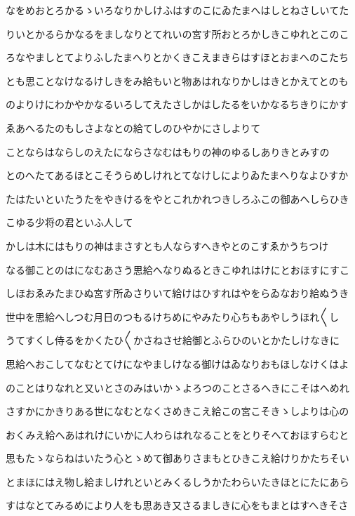 \documentclass[a4paper,11pt,landscape]{ltjtarticle}
\begin{document}
なをめおとろかるゝいろなりかしけふはすのこにゐたまへはしとねさしいてた
\par\medskip
りいとかるらかなるをましなりとてれいの宮す所おとろかしきこゆれとこのこ
\par\medskip
ろなやましとてよりふしたまへりとかくきこえまきらはすほとおまへのこたち
\par\medskip
とも思ことなけなるけしきをみ給もいと物あはれなりかしはきとかえてとのも
\par\medskip
のよりけにわかやかなるいろしてえたさしかはしたるをいかなるちきりにかす
\par\medskip
ゑあへるたのもしさよなとの給てしのひやかにさしよりて
\par\medskip
ことならはならしのえたにならさなむはもりの神のゆるしありきとみすの
\par\medskip
とのへたてあるほとこそうらめしけれとてなけしによりゐたまへりなよひすか
\par\medskip
たはたいといたうたをやきけるをやとこれかれつきしろふこの御あへしらひき
\par\medskip
こゆる少将の君といふ人して
\par\medskip
かしは木にはもりの神はまさすとも人ならすへきやとのこすゑかうちつけ
\par\medskip
なる御ことのはになむあさう思給へなりぬるときこゆれはけにとおほすにすこ
\par\medskip
しほおゑみたまひぬ宮す所ゐさりいて給けはひすれはやをらゐなおり給ぬうき
\par\medskip
世中を思給へしつむ月日のつもるけちめにやみたり心ちもあやしうほれ〱し
\par\medskip
うてすくし侍るをかくたひ〱かさねさせ給御とふらひのいとかたしけなきに
\par\medskip
思給へおこしてなむとてけになやましけなる御けはゐなりおもほしなけくはよ
\par\medskip
のことはりなれと又いとさのみはいかゝよろつのことさるへきにこそはへめれ
\par\medskip
さすかにかきりある世になむとなくさめきこえ給この宮こそきゝしよりは心の
\par\medskip
おくみえ給へあはれけにいかに人わらはれなることをとりそへておほすらむと
\par\medskip
思もたゝならねはいたう心とゝめて御ありさまもとひきこえ給けりかたちそい
\par\medskip
とまほにはえ物し給ましけれといとみくるしうかたわらいたきほとにたにあら
\par\medskip
すはなとてみるめにより人をも思あき又さるましきに心をもまとはすへきそさ
\end{document}
